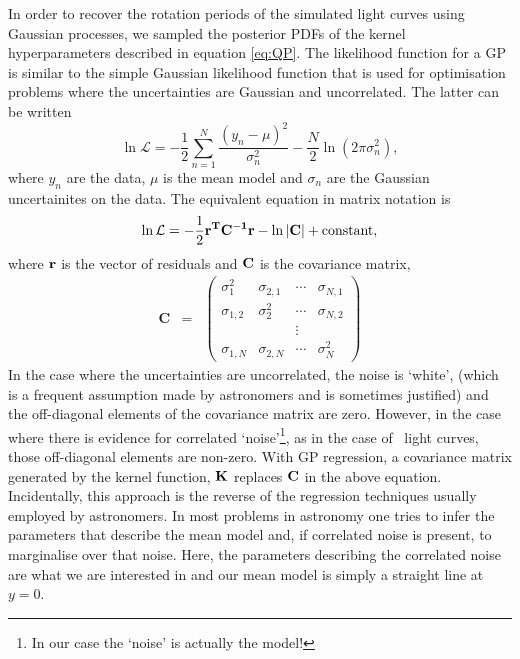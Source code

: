 In order to recover the rotation periods of the simulated light curves using
Gaussian processes, we sampled the posterior PDFs of the kernel
hyperparameters described in equation \ref{eq:QP}.
The likelihood function for a GP is similar to the simple Gaussian likelihood
function that is used for optimisation problems where the uncertainties are
Gaussian and uncorrelated.
The latter can be written
\begin{equation}
\ln \mathcal{L} = -\frac{1}{2}\sum_{n=1}^N\frac{(y_n-\mu)^2}{\sigma_n^2}
    - \frac{N}{2}\ln(2\pi\sigma_n^2),
\end{equation}
\label{eq:chi2}
where $y_n$ are the data, $\mu$ is the mean model and $\sigma_n$ are the
Gaussian uncertainites on the data.
The equivalent equation in matrix notation is
\begin{equation}
\ln \mathcal{L} = -\frac{1}{2}\bf{r}^T\bf{C}^{-1}\bf{r}-\ln|\bf{C}|
    + \mathrm{constant},
\end{equation}
\label{eq:lhf1}
where $\bf{r}$ is the vector of residuals and $\bf{C}$ is the covariance
matrix,
\begin{eqnarray}
	\mathbf{C} &=& \left (\begin{array}{cccc}
	\sigma^2_1 & \sigma_{2, 1} & \cdots & \sigma_{N, 1} \\
	\sigma_{1, 2} & \sigma^2_2 & \cdots & \sigma_{N, 2} \\
    && \vdots & \\
	\sigma_{1, N} & \sigma_{2, N} & \cdots & \sigma^2_N
\end{array}\right )
\end{eqnarray}
In the case where the uncertainties are uncorrelated, the noise is `white',
(which is a frequent assumption made by astronomers and is sometimes
justified) and the off-diagonal elements of the covariance matrix are zero.
However, in the case where there is evidence for correlated
`noise'\footnote{In our case the `noise' is actually the model!}, as in the
case of \Kepler\ light curves, those off-diagonal elements are non-zero.
With GP regression, a covariance matrix generated by the kernel function,
${\bf K}$ replaces ${\bf C}$ in the above equation.
Incidentally, this approach is the reverse of the regression techniques
usually employed by astronomers.
In most problems in astronomy one tries to infer the parameters that describe
the mean model and, if correlated noise is present, to marginalise over that
noise.
Here, the parameters describing the correlated noise are what we are
interested in and our mean model is simply a straight line at $y=0$.

